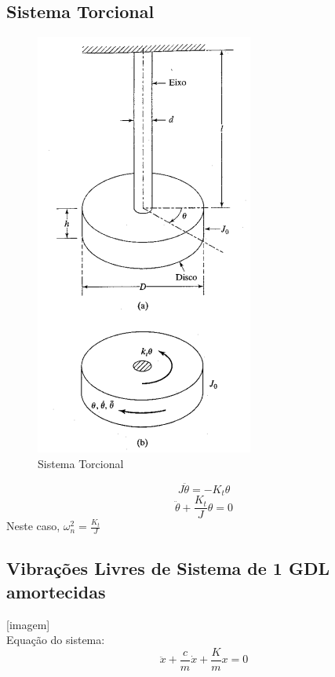 \documentclass[a4paper, 12pt]{article}
\begin{document}
\subsection{Sistema Torcional}
	\begin{figure}[h]
	\centering
	\includegraphics[scale=0.5]{a6.png}
	\caption{Sistema Torcional}
	\end{figure}
	
	\begin{equation}
	J\ddot{\theta} = -K_t \theta
	\end{equation}
	\begin{equation}
	\boxed{\ddot{\theta} + \frac{K_t}{J}\theta = 0}
	\end{equation}
	Neste caso, $\omega_n^2 = \frac{K_t}{J}$
	
\subsection{Vibrações Livres de Sistema de 1 GDL amortecidas}
	
	[imagem]\\
	
	Equação do sistema:
	\begin{equation}
	\boxed{\ddot{x} + \frac{c}{m}\dot{x}+\frac{K}{m}x = 0}
	\end{equation}
	
\end{document}
